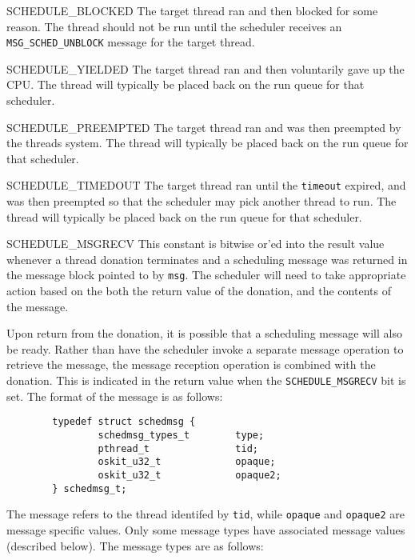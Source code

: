 \begin{apidesc}
\begin{icsymlist}
	\item[SCHEDULE_BLOCKED] The target thread ran and then blocked for
	some reason. The thread should not be run until the scheduler
	receives an \texttt{MSG_SCHED_UNBLOCK} message for the target
	thread.

	\item[SCHEDULE_YIELDED] The target thread ran and then voluntarily
	gave up the CPU\@. The thread will typically be placed back on the
	run queue for that scheduler.

	\item[SCHEDULE_PREEMPTED] The target thread ran and was then
	preempted by the threads system. The thread will typically be
	placed back on the run queue for that scheduler.

	\item[SCHEDULE_TIMEDOUT] The target thread ran until the
	\texttt{timeout} expired, and was then preempted so that the
	scheduler may pick another thread to run. The thread will typically
	be placed back on the run queue for that scheduler.

	\item[SCHEDULE_MSGRECV] This constant is bitwise or'ed into the
	result value whenever a thread donation terminates and a scheduling
	message was returned in the message block pointed to by
	\texttt{msg}. The scheduler will need to take appropriate action
	based on the both the return value of the donation, and the
	contents of the message. 
	\end{icsymlist}

	Upon return from the donation, it is possible that a scheduling
	message will also be ready. Rather than have the scheduler invoke a
	separate message operation to retrieve the message, the message
	reception operation is combined with the donation. This is
	indicated in the return value when the \texttt{SCHEDULE_MSGRECV}
	bit is set. The format of the message is as follows:

	\begin{codefrag}
        \begin{verbatim}
        typedef struct schedmsg {
                schedmsg_types_t        type;   
                pthread_t               tid;    
                oskit_u32_t             opaque; 
                oskit_u32_t             opaque2;
        } schedmsg_t;
        \end{verbatim}
	\end{codefrag}

	The message refers to the thread identifed by \texttt{tid}, while
	\texttt{opaque} and \texttt{opaque2} are message specific values.
	Only some message types have associated message values (described
	below).  The message types are as follows:


\end{apidesc}
